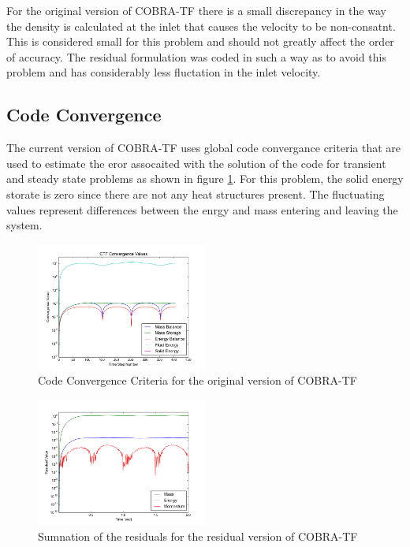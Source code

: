 \documentclass{mc2015}
\begin{document}
For the original version of COBRA-TF there is a small discrepancy in the way the
density is calculated at the inlet that causes the velocity to be non-consatnt.
 This is considered small for this problem and should not greatly affect the
 order of accuracy. The residual formulation was coded in such a way as to avoid
 this problem and has considerably less fluctation in the inlet velocity.

\subsection{Code Convergence}

The current version of COBRA-TF uses global code convergance criteria that are
used to estimate the eror assocaited with the solution of the code for transient
and steady state problems as shown in figure
\ref{fig:Code_Convergance:Original}. For this problem, the solid energy storate
is zero since there are not any heat structures present. The fluctuating values
represent differences between the enrgy and mass entering and leaving the
system.

\begin{figure}[!h]
	\centering
	\includegraphics[width=0.50\textwidth]{images/Code_Verification/run_00_00/original/results/Convergence_Plot}
	\caption{Code Convergence Criteria for the original version of COBRA-TF}
	\label{fig:Code_Convergance:Original}
\end{figure}

\begin{figure}[!h]
	\centering
	\includegraphics[width=0.50\textwidth]{images/Code_Verification/run_00_00/residual/results/Residuals_Plot}
	\caption{Sumnation of the residuals for the residual version of COBRA-TF}
	\label{fig:Residuals_Plot}
\end{figure}
\end{document}
